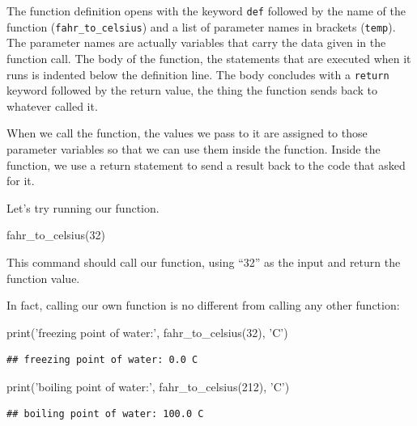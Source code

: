 \documentclass[]{book}
\newenvironment{Shaded}{\begin{snugshade}}{\end{snugshade}}
\newcommand{\BuiltInTok}[1]{#1}
\newcommand{\DecValTok}[1]{\textcolor[rgb]{0.00,0.00,0.81}{#1}}
\newcommand{\NormalTok}[1]{#1}
\newcommand{\StringTok}[1]{\textcolor[rgb]{0.31,0.60,0.02}{#1}}
\theoremstyle{definition}
\theoremstyle{definition}
\theoremstyle{definition}
\theoremstyle{remark}
\begin{document}
The function definition opens with the keyword \texttt{def} followed by
the name of the function (\texttt{fahr\_to\_celsius}) and a list of
parameter names in brackets (\texttt{temp}). The parameter names are
actually variables that carry the data given in the function call. The
body of the function, the statements that are executed when it runs is
indented below the definition line. The body concludes with a
\texttt{return} keyword followed by the return value, the thing the
function sends back to whatever called it.

When we call the function, the values we pass to it are assigned to
those parameter variables so that we can use them inside the function.
Inside the function, we use a return statement to send a result back to
the code that asked for it.

Let's try running our function.

\begin{Shaded}
\begin{Highlighting}[]
\NormalTok{fahr_to_celsius(}\DecValTok{32}\NormalTok{)}
\end{Highlighting}
\end{Shaded}

This command should call our function, using ``32'' as the input and
return the function value.

In fact, calling our own function is no different from calling any other
function:

\begin{Shaded}
\begin{Highlighting}[]
\BuiltInTok{print}\NormalTok{(}\StringTok{'freezing point of water:'}\NormalTok{, fahr_to_celsius(}\DecValTok{32}\NormalTok{), }\StringTok{'C'}\NormalTok{)}
\end{Highlighting}
\end{Shaded}

\begin{verbatim}
## freezing point of water: 0.0 C
\end{verbatim}

\begin{Shaded}
\begin{Highlighting}[]
\BuiltInTok{print}\NormalTok{(}\StringTok{'boiling point of water:'}\NormalTok{, fahr_to_celsius(}\DecValTok{212}\NormalTok{), }\StringTok{'C'}\NormalTok{)}
\end{Highlighting}
\end{Shaded}

\begin{verbatim}
## boiling point of water: 100.0 C
\end{verbatim}
\end{document}
